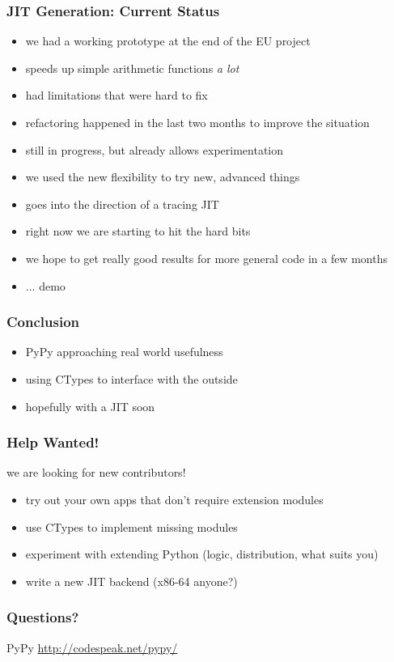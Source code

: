 \documentclass[utf8x]{beamer}
\begin{document}
\begin{frame}
  \frametitle{JIT Generation: Current Status}
  \begin{itemize}
  \item we had a working prototype at the end of the EU project
  \item speeds up simple arithmetic functions \emph{a lot}
  \item had limitations that were hard to fix
  \pause
  \item refactoring happened in the last two months to improve the situation
  \item still in progress, but already allows experimentation
  \item we used the new flexibility to try new, advanced things
  \item goes into the direction of a tracing JIT
  \item right now we are starting to hit the hard bits
  \item we hope to get really good results for more general code in a few months
  \item ... demo
  \end{itemize}
\end{frame}

\begin{frame}
  \frametitle{Conclusion}
  \begin{itemize}
  \item PyPy approaching real world usefulness
  \item using CTypes to interface with the outside
  \item hopefully with a JIT soon
  \end{itemize}
\end{frame}

\begin{frame}
  \frametitle{Help Wanted!}
  we are looking for new contributors!
  \begin{itemize}
  \item try out your own apps that don't require extension modules
  \item use CTypes to implement missing modules
  \item experiment with extending Python (logic, distribution, what suits you)
  \item write a new JIT backend (x86-64 anyone?)
  \end{itemize}
\end{frame}

\begin{frame}
  \frametitle{Questions?}
  \begin{block}{
    PyPy}
    \bigskip
    \hskip 1cm \url{http://codespeak.net/pypy/}
    \bigskip
  \end{block}
\end{frame}
\end{document}
